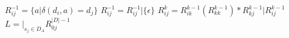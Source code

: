 \documentclass[varwidth=\maxdimen]{standalone}
\begin{document}
\begin{algorithmic}[1] %
      \State $R_{ij}^{-1}=\{a\vert \delta(d_i,a)=d_j\}$
        \State $R_{ij}^{-1}=R_{ij}^{-1}\vert\{\epsilon\}$
      \EndIf
    \EndFor
  \EndFor
        \State $R_{ij}^{k}=R_{ik}^{k-1}(R_{kk}^{k-1})\ast R_{kj}^{k-1} \vert R_{ij}^{k-1}$
      \EndFor
    \EndFor
  \EndFor
  \State $L=\vert_{s_j\in D_A} R_{0j}^{\vert D\vert-1}$
\end{algorithmic}
\end{document}
